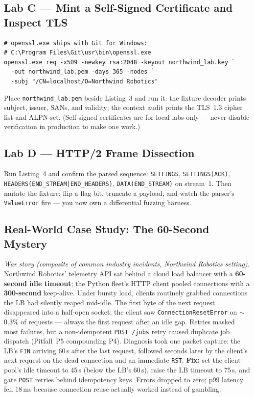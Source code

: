 \subsection{Lab C --- Mint a Self-Signed Certificate and Inspect TLS}

\begin{verbatim}
# openssl.exe ships with Git for Windows:
# C:\Program Files\Git\usr\bin\openssl.exe
openssl.exe req -x509 -newkey rsa:2048 -keyout northwind_lab.key `
  -out northwind_lab.pem -days 365 -nodes `
  -subj "/CN=localhost/O=Northwind Robotics"
\end{verbatim}

Place \texttt{northwind\_lab.pem} beside Listing~3 and run it: the fixture decoder prints subject, issuer, SANs, and validity; the context audit prints the TLS~1.3 cipher list and ALPN set. (Self-signed certificates are for local labs only --- never disable verification in production to make one work.)

\subsection{Lab D --- HTTP/2 Frame Dissection}

Run Listing~4 and confirm the parsed sequence: \texttt{SETTINGS}, \texttt{SETTINGS(ACK)}, \texttt{HEADERS(END\_STREAM|END\_HEADERS)}, \texttt{DATA(END\_STREAM)} on stream~1. Then mutate the fixture: flip a flag bit, truncate a payload, and watch the parser's \texttt{ValueError} fire --- you now own a differential fuzzing harness.

\subsection{Real-World Case Study: The 60-Second Mystery}

\emph{War story (composite of common industry incidents, Northwind Robotics setting).} Northwind Robotics' telemetry API sat behind a cloud load balancer with a \textbf{60-second idle timeout}; the Python fleet's HTTP client pooled connections with a \textbf{300-second} keep-alive. Under bursty load, clients routinely grabbed connections the LB had silently reaped mid-idle. The first byte of the next request disappeared into a half-open socket; the client saw \texttt{ConnectionResetError} on $\sim$0.3\% of requests --- always the first request after an idle gap. Retries masked most failures, but a non-idempotent \texttt{POST /jobs} retry caused duplicate job dispatch (Pitfall~P5 compounding P4). Diagnosis took one packet capture: the LB's \texttt{FIN} arriving 60\,s after the last request, followed seconds later by the client's next request on the dead connection and an immediate \texttt{RST}. \textbf{Fix:} set the client pool's idle timeout to 45\,s (below the LB's 60\,s), raise the LB timeout to 75\,s, and gate \texttt{POST} retries behind idempotency keys. Errors dropped to zero; p99 latency fell 18\,ms because connection reuse actually worked instead of gambling.

